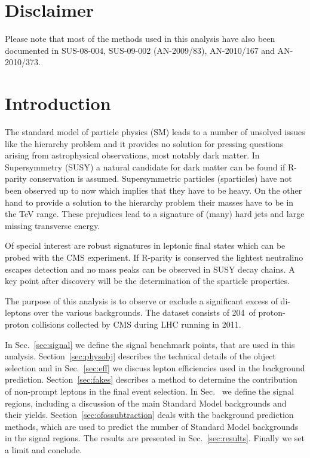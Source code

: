 \section{Disclaimer}

Please note that most of the methods used in this analysis have also been documented in SUS-08-004,
SUS-09-002 (AN-2009/83), AN-2010/167 and AN-2010/373.

\section{Introduction}

The standard model of particle physics (SM) leads to a number of unsolved issues like the 
hierarchy problem and it provides no solution for pressing questions arising from astrophysical 
observations, most notably dark matter. In Supersymmetry (SUSY) a natural candidate for dark matter 
can be found if R-parity conservation is assumed. Supersymmetric particles (sparticles) have not 
been observed up to now which implies that they have to be heavy. 
On the other hand to provide a solution to the hierarchy problem their masses have to be in the TeV range.
These prejudices lead to a signature of (many) hard jets and large missing transverse energy.

Of special interest are robust signatures in leptonic final states which can be probed with the CMS experiment.
If R-parity is conserved the lightest neutralino escapes detection and no mass peaks can be observed 
in SUSY decay chains. A key point after discovery will be the determination of the sparticle properties. 

The purpose of this analysis is to observe or exclude a significant excess of di-leptons 
over the various backgrounds.
The dataset consists of 204~\pbi of proton-proton collisions collected by CMS during LHC
running in 2011.

In Sec.~\ref{sec:signal} we define the signal benchmark points, that are used in this analysis.
Section~\ref{sec:physobj} describes the technical details of the object selection
and in Sec.~\ref{sec:eff} we discuss lepton efficiencies used in the background
prediction.
Section~\ref{sec:fakes} describes a method to determine the contribution
of non-prompt leptons in the final event selection.
In Sec.~\label{sec:eventselection} we define the signal regions, including a discussion of the main
Standard Model backgrounds and their yields. %
Section~\ref{sec:ofossubtraction} deals with the background prediction methods,
which are used to predict the number of Standard Model backgrounds in the signal
regions. The results are presented in Sec.~\ref{sec:results}. 
Finally we set a limit and conclude.
